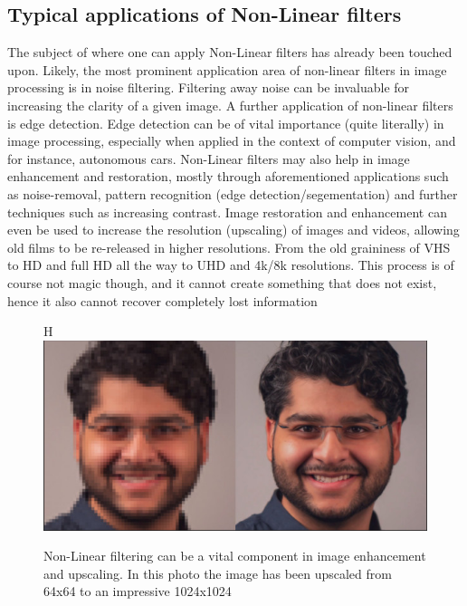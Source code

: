 \documentclass[twoside,a4paper,article]{combine}
\begin{document}
\subsection{Typical applications of Non-Linear filters}
The subject of where one can apply Non-Linear filters has already been touched upon. Likely, the most prominent application area of non-linear filters in image processing is in noise filtering. Filtering away noise can be invaluable for increasing the clarity of a given image. A further application of non-linear filters is edge detection. Edge detection can be of vital importance (quite literally) in image processing, especially when applied in the context of computer vision, and for instance, autonomous cars. Non-Linear filters may also help in image enhancement and restoration, mostly through aforementioned applications such as noise-removal, pattern recognition (edge detection/segementation) and further techniques such as increasing contrast. Image restoration and enhancement can even be used to increase the resolution (upscaling) of images and videos, allowing old films to be re-released in higher resolutions. From the old graininess of VHS to HD and full HD all the way to UHD and 4k/8k resolutions. This process is of course not magic though, and it cannot create something that does not exist, hence it also cannot recover completely lost information\cite{sharmila}\footnotemark{}
\begin{figure}{H}
    \centering
    \includegraphics[width=1\linewidth]{upscaling.PNG}
    \caption{Non-Linear filtering can be a vital component in image enhancement and upscaling. In this photo the image has been upscaled from 64x64 to an impressive 1024x1024}
    \label{fig:enter-label}
\end{figure}
\end{document}
